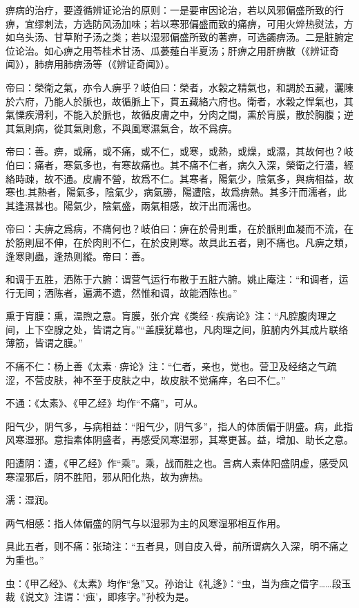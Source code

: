 \documentclass[draft,12pt]{ctexbook}
\begin{document}

痹病的治疗，要遵循辨证论治的原则：一是要审因论治，若以风邪偏盛所致的行痹，宜缪刺法，方选防风汤加味；若以寒邪偏盛而致的痛痹，可用火焠热熨法，方如乌头汤、甘草附子汤之类；若以湿邪偏盛所致的著痹，可选蠲痹汤。二是脏腑定位论治。如心痹之用苓桂术甘汤、瓜蒌薤白半夏汤；肝痹之用肝痹散（《辨证奇闻》），肺痹用肺痹汤等（《辨证奇闻》）。


\begin{yuanwen}
帝曰：榮衛之氣，亦令人痹乎？岐伯曰：榮者，水榖之精氣也，和調於五藏，灑陳於六府，乃能人於脈也，故循脈上下，貫五藏絡六府也。衛者，水榖之悍氣也，其氣慄疾滑利，不能入於脈也，故循皮膚之中，分肉之間，熏於肓膜，散於胸腹；逆其氣則病，從其氣則愈，不與風寒濕氣合，故不爲痹。

帝曰：善。痹，或痛，或不痛，或不仁，或寒，或熱，或燥，或濕，其故何也？岐伯曰：痛者，寒氣多也，有寒故痛也。其不痛不仁者，病久入深，榮衛之行濇，經絡時疎，故不通。皮膚不營，故爲不仁。其寒者，陽氣少，陰氣多，與病相益，故寒也.其熱者，陽氣多，陰氣少，病氣勝，陽遭陰，故爲痹熱。其多汗而濡者，此其逢濕甚也。陽氣少，陰氣盛，兩氣相感，故汗出而濡也。

帝曰：夫痹之爲病，不痛何也？岐伯曰：痹在於骨則重，在於脈則血凝而不流，在於筋則屈不伸，在於肉則不仁，在於皮則寒。故具此五者，則不痛也。凡痹之類，逢寒則蟲，逢热则縱。帝曰：善。
\end{yuanwen}


\begin{jiaozhu}
  \item 和调于五胜，洒陈于六腑：谓营气运行布散于五脏六腑。姚止庵注：“和调者，运行无间；洒陈者，遍满不遗，然惟和调，故能洒陈也。”
  \item 熏于肓膜：熏，温煦之意。肓膜，张介宾《类经·疾病论》注：“凡腔腹肉理之间，上下空腺之处，皆谓之肓。”“盖膜犹幕也，凡肉理之间，脏腑内外其成片联络薄筋，皆谓之膜。”
  \item 不痛不仁：杨上善《太素·痹论》注：“仁者，亲也，觉也。营卫及经络之气疏涩，不营皮肤，神不至于皮肤之中，故皮肤不觉痛痒，名曰不仁。”
  \item 不通：《太素》、《甲乙经》均作“不痛”，可从。
  \item 阳气少，阴气多，与病相益：“阳气少，阴气多”，指人的体质偏于阴盛。病，此指风寒湿邪。意指素体阴盛者，再感受风寒湿邪，其寒更甚。益，增加、助长之意。
  \item 阳遭阴：遭，《甲乙经》作“乘”。乘，战而胜之也。言病人素体阳盛阴虚，感受风寒湿邪后，阴不胜阳，邪从阳化热，故为痹热。
  \item 濡：湿润。
  \item 两气相感：指人体偏盛的阴气与以湿邪为主的风寒湿邪相互作用。
  \item 具此五者，则不痛：张琦注：“五者具，则自皮入骨，前所谓病久入深，明不痛之为重也。”
  \item 虫：《甲乙经》、《太素》均作“急”又。孙诒让《礼迻》：“虫，当为痋之借字……段玉裁《说文》注谓：‘痋’，即疼字。”孙校为是。
\end{jiaozhu}
\end{document}

